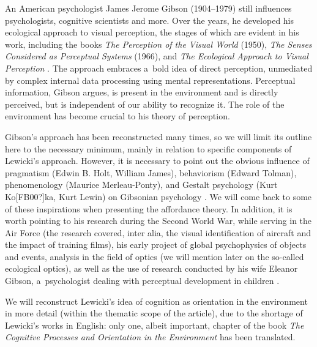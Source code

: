 \documentclass[%
manuscript=article,
year=2024,
volume=77,
doi=00000.000,
]{zfn}
\begin{document}
An American psychologist James Jerome Gibson (1904–1979) still influences psychologists, cognitive scientists and more. Over the years, he developed his ecological approach to visual perception, the stages of which are evident in his work, including the books \textit{The Perception of the Visual World} (1950), \textit{The Senses Considered as Perceptual Systems} (1966), and \textit{The Ecological Approach to Visual Perception} 
\parencite*[][]{}. %
 The approach embraces a~bold idea of direct perception, unmediated by complex internal data processing using mental representations. Perceptual information, Gibson argues, is present in the environment and is directly perceived, but is independent of our ability to recognize it. The role of the environment has become crucial to his theory of perception.



Gibson's approach has been reconstructed many times, so we will limit its outline here to the necessary minimum, mainly in relation to specific components of Lewicki's approach. However, it is necessary to point out the obvious influence of pragmatism (Edwin B. Holt, William James), behaviorism (Edward Tolman), phenomenology (Maurice Merleau-Ponty), and Gestalt psychology (Kurt Ko[FB00?]ka, Kurt Lewin) on Gibsonian psychology 
\parencite[see][]{lobo_history_2018}. %
 We will come back to some of these inspirations when presenting the affordance theory. In addition, it is worth pointing to his research during the Second World War, while serving in the Air Force (the research covered, inter alia, the visual identification of aircraft and the impact of training films), his early project of global psychophysics of objects and events, analysis in the field of optics (we will mention later on the so-called ecological optics), as well as the use of research conducted by his wife Eleanor Gibson, a~psychologist dealing with perceptual development in children 
\parencites[][]{gibson_principles_1969}[][]{hochberg_james_1994}[][]{heft_ecological_2001}[][]{lobo_history_2018}.%




We will reconstruct Lewicki's idea of cognition as orientation in the environment in more detail (within the thematic scope of the article), due to the shortage of Lewicki's works in English: only one, albeit important, chapter of the book \textit{The Cognitive Processes and Orientation in the Environment} 
\parencite*[][]{} %
 has been translated.
\end{document}
